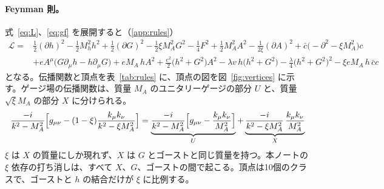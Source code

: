 \documentclass[a4paper,10pt]{ltjsarticle}
\begin{document}
\paragraph{Feynman 則。}式~\eqref{eq:L}、\eqref{eq:gf} を展開すると（\ref{app:rules}）
\begin{equation}
\begin{aligned}
\mathcal L={}&\frac12(\partial h)^2-\frac12M_h^2h^2+\frac12(\partial G)^2-\frac12\xi M_A^2G^2-\frac14F^2+\frac12M_A^2A^2-\frac1{2\xi}(\partial A)^2+\bar c\bigl(-\partial^2-\xi M_A^2\bigr)c\\
&+eA^\mu\bigl(G\partial_\mu h-h\partial_\mu G\bigr)+eM_A\,hA^2+\frac{e^2}2\bigl(h^2+G^2\bigr)A^2-\lambda v\,h\bigl(h^2+G^2\bigr)-\frac\lambda4\bigl(h^2+G^2\bigr)^2-\xi eM_A\,h\,\bar cc
\end{aligned}
\label{eq:Lexp}
\end{equation}
となる。伝播関数と頂点を表~\ref{tab:rules} に、頂点の図を図~\ref{fig:vertices} に示す。ゲージ場の伝播関数は、質量 $M_A$ のユニタリーゲージの部分 $U$ と、質量 $\sqrt\xi M_A$ の部分 $X$ に分けられる。
\begin{equation}
\frac{-i}{k^2-M_A^2}\Bigl[g_{\mu\nu}-(1-\xi)\frac{k_\mu k_\nu}{k^2-\xi M_A^2}\Bigr]
=\underbrace{\frac{-i}{k^2-M_A^2}\Bigl[g_{\mu\nu}-\frac{k_\mu k_\nu}{M_A^2}\Bigr]}_{U}
+\underbrace{\frac{-i}{k^2-\xi M_A^2}\,\frac{k_\mu k_\nu}{M_A^2}}_{X}
\label{eq:propsplit}
\end{equation}
$\xi$ は $X$ の質量にしか現れず、$X$ は $G$ とゴーストと同じ質量を持つ。本ノートの $\xi$ 依存の打ち消しは、すべて $X$、$G$、ゴーストの間で起こる。頂点は10個のクラスで、ゴーストと $h$ の結合だけが $\xi$ に比例する。
\end{document}
